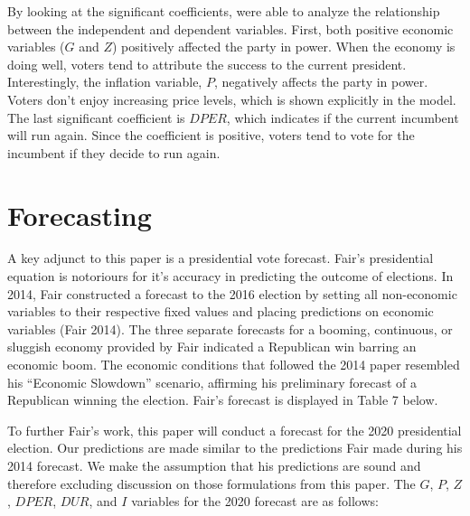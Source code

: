 \documentclass[11,]{article}
\begin{document}
By looking at the significant coefficients, were able to analyze the
relationship between the independent and dependent variables. First,
both positive economic variables (\(G\) and \(Z\)) positively affected
the party in power. When the economy is doing well, voters tend to
attribute the success to the current president. Interestingly, the
inflation variable, \(P\), negatively affects the party in power. Voters
don't enjoy increasing price levels, which is shown explicitly in the
model. The last significant coefficient is \(DPER\), which indicates if
the current incumbent will run again. Since the coefficient is positive,
voters tend to vote for the incumbent if they decide to run again.

\hypertarget{forecasting}{%
\section{Forecasting}\label{forecasting}}

A key adjunct to this paper is a presidential vote forecast. Fair's
presidential equation is notoriours for it's accuracy in predicting the
outcome of elections. In 2014, Fair constructed a forecast to the 2016
election by setting all non-economic variables to their respective fixed
values and placing predictions on economic variables (Fair 2014). The
three separate forecasts for a booming, continuous, or sluggish economy
provided by Fair indicated a Republican win barring an economic boom.
The economic conditions that followed the 2014 paper resembled his
``Economic Slowdown'' scenario, affirming his preliminary forecast of a
Republican winning the election. Fair's forecast is displayed in Table 7
below.

To further Fair's work, this paper will conduct a forecast for the 2020
presidential election. Our predictions are made similar to the
predictions Fair made during his 2014 forecast. We make the assumption
that his predictions are sound and therefore excluding discussion on
those formulations from this paper. The \(G\), \(P\), \(Z\), \(DPER\),
\(DUR\), and \(I\) variables for the 2020 forecast are as follows:
\end{document}
